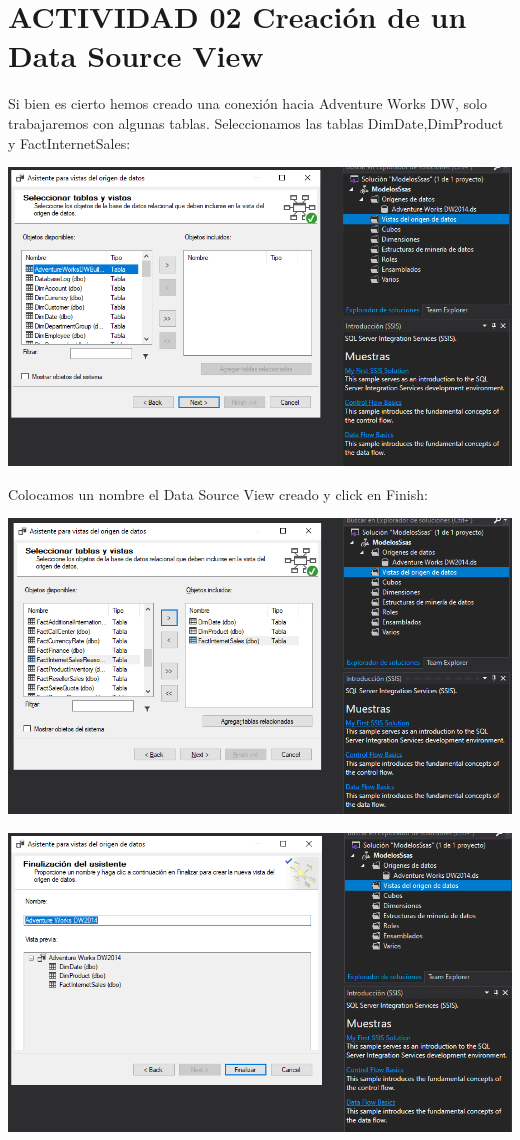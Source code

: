 \section{ACTIVIDAD 02 Creación de un Data Source View}

Si bien es cierto hemos creado una conexión hacia Adventure Works DW, solo trabajaremos con algunas tablas. 			Seleccionamos las tablas DimDate,DimProduct y FactInternetSales:
	\begin{center}
	\includegraphics[width=\columnwidth]{images/task1/9}
    \end{center}	
    
Colocamos un nombre el Data Source View creado y click en Finish:
	\begin{center}
	\includegraphics[width=\columnwidth]{images/task1/10}
    \end{center}	
    
	\begin{center}
	\includegraphics[width=\columnwidth]{images/task1/11}
    \end{center}	
    
